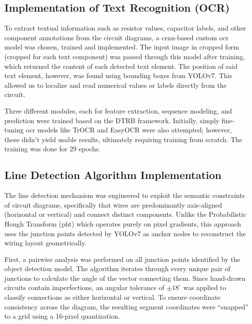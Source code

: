 \subsection{Implementation of Text Recognition (OCR)}

To extract textual information such as resistor values, capacitor labels, and other component annotations from the circuit diagrams, a \gls{crnn}-based custom \gls{ocr} model was chosen, trained and implemented. The input image in cropped form (cropped for each text component) was passed through this model after training, which returned the content of each detected text element. The position of said text element, however, was found using bounding boxes from YOLOv7. This allowed us to localize and read numerical values or labels directly from the circuit.

Three different modules, each for feature extraction, sequence modeling, and prediction were trained based on the DTRB framework. Initially, simply fine-tuning \gls{ocr} models like TrOCR and EasyOCR were also attempted; however, these didn't yield usable results, ultimately requiring training from scratch. The training was done for 29 epochs.

\subsection{Line Detection Algorithm Implementation}

The line detection mechanism was engineered to exploit the semantic constraints of circuit diagrams, specifically that wires are predominantly axis-aligned (horizontal or vertical) and connect distinct components. Unlike the Probabilistic Hough Transform (\gls{pht}) which operates purely on pixel gradients, this approach uses the junction points detected by YOLOv7 as anchor nodes to reconstruct the wiring layout geometrically.

First, a pairwise analysis was performed on all junction points identified by the object detection model. The algorithm iterates through every unique pair of junctions to calculate the angle of the vector connecting them. Since hand-drawn circuits contain imperfections, an angular tolerance of $\pm 18^\circ$ was applied to classify connections as either horizontal or vertical. To ensure coordinate consistency across the diagram, the resulting segment coordinates were ``snapped'' to a grid using a 16-pixel quantization.

